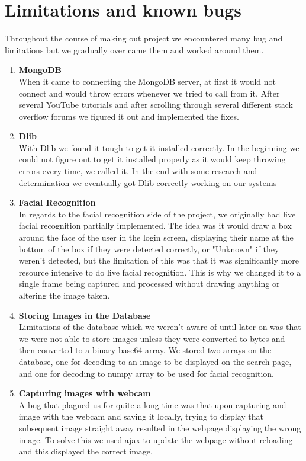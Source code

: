 \documentclass{article}
\begin{document}
\newpage

\section{Limitations and known bugs}
Throughout the course of making out project we encountered many bug and limitations but we gradually over came them and worked around them.
\begin{enumerate}
\item \textbf{MongoDB} \\
When it came to connecting the MongoDB server, at first it would not connect and would throw errors whenever we tried to call from it. After several YouTube tutorials and after scrolling through several different stack overflow forums we figured it out and implemented the fixes. 
\item \textbf{Dlib} \\
With Dlib we found it tough to get it installed correctly. In the beginning we could not figure out to get it installed properly as it would keep throwing errors every time, we called it. In the end with some research and determination we eventually got Dlib correctly working on our systems
\item \textbf{Facial Recognition} \\
In regards to the facial recognition side of the project, we originally had live facial recognition partially implemented. The idea was it would draw a box around the face of the user in the login screen, displaying their name at the bottom of the box if they were detected correctly, or "Unknown" if they weren't detected, but the limitation of this was that it was significantly more resource intensive to do live facial recognition. This is why we changed it to a single frame being captured and processed without drawing anything or altering the image taken.
\item \textbf{Storing Images in the Database} \\
Limitations of the database which we weren't aware of until later on was that we were not able to store images unless they were converted to bytes and then converted to a binary base64 array. We stored two arrays on the database, one for decoding to an image to be displayed on the search page, and one for decoding to numpy array to be used for facial recognition.
\item \textbf{Capturing images with webcam} \\
A bug that plagued us for quite a long time was that upon capturing and image with the webcam and saving it locally, trying to display that subsequent image straight away resulted in the webpage displaying the wrong image. To solve this we used ajax to update the webpage without reloading and this displayed the correct image.

\end{enumerate}
\end{document}
